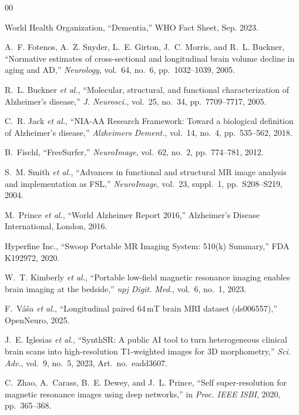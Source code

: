\documentclass[12pt,a4paper]{article}
\begin{document}
\begin{thebibliography}{00}

World Health Organization, ``Dementia,'' WHO Fact Sheet, Sep. 2023.

A.~F. Fotenos, A.~Z. Snyder, L.~E. Girton, J.~C. Morris, and R.~L. Buckner,
``Normative estimates of cross-sectional and longitudinal brain volume
decline in aging and AD,''
\emph{Neurology}, vol.~64, no.~6, pp.~1032--1039, 2005.

R.~L. Buckner \emph{et al.},
``Molecular, structural, and functional characterization of Alzheimer's
disease,''
\emph{J. Neurosci.}, vol.~25, no.~34, pp.~7709--7717, 2005.

C.~R. Jack \emph{et al.},
``NIA-AA Research Framework: Toward a biological definition of
Alzheimer's disease,''
\emph{Alzheimers Dement.}, vol.~14, no.~4, pp.~535--562, 2018.

B.~Fischl, ``FreeSurfer,''
\emph{NeuroImage}, vol.~62, no.~2, pp.~774--781, 2012.

S.~M. Smith \emph{et al.},
``Advances in functional and structural MR image analysis and
implementation as FSL,''
\emph{NeuroImage}, vol.~23, suppl.~1, pp.~S208--S219, 2004.

M.~Prince \emph{et al.},
``World Alzheimer Report 2016,''
Alzheimer's Disease International, London, 2016.

Hyperfine Inc., ``Swoop Portable MR Imaging System: 510(k) Summary,''
FDA K192972, 2020.

W.~T. Kimberly \emph{et al.},
``Portable low-field magnetic resonance imaging enables brain imaging
at the bedside,''
\emph{npj Digit. Med.}, vol.~6, no.~1, 2023.

F.~V{\'a}{\v s}a \emph{et al.},
``Longitudinal paired 64\,mT brain MRI dataset (ds006557),''
OpenNeuro, 2025.

J.~E. Iglesias \emph{et al.},
``SynthSR: A public AI tool to turn heterogeneous clinical brain scans
into high-resolution T1-weighted images for 3D morphometry,''
\emph{Sci. Adv.}, vol.~9, no.~5, 2023, Art.~no.~eadd3607.

C.~Zhao, A.~Carass, B.~E. Dewey, and J.~L. Prince,
``Self super-resolution for magnetic resonance images using deep
networks,''
in \emph{Proc. IEEE ISBI}, 2020, pp.~365--368.


\end{thebibliography}
\end{document}
